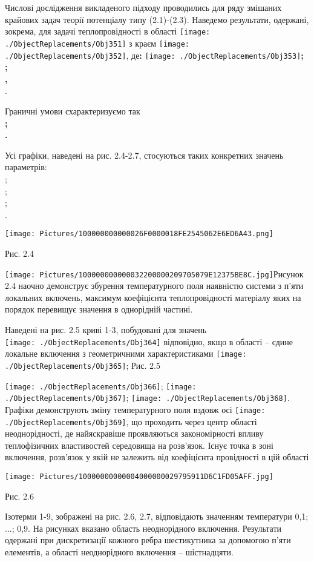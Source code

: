 Числові дослідження викладеного підходу проводились для ряду змішаних
крайових задач теорії потенціалу типу (2.1)-(2.3). Наведемо результати,
одержані, зокрема, для задачі теплопровідності в області
\texttt{[image: ./ObjectReplacements/Obj351]}
з краєм
\texttt{[image: ./ObjectReplacements/Obj352]},
де\textbf{:
}\texttt{[image: ./ObjectReplacements/Obj353]}\textbf{;
}\[\]\textbf{; }\[\]\textbf{, }\[\].

Граничні умови схарактеризуємо так \[\]\textbf{; }\[\]\textbf{. }

Усі графіки, наведені на рис. 2.4-2.7, стосуються таких конкретних
значень параметрів: \[\]; \[\]; \[\]; \[\].

\texttt{[image: Pictures/100000000000026F0000018FE2545062E6ED6A43.png]}

Рис. 2.4

\texttt{[image: Pictures/100000000000032200000209705079E12375BE8C.jpg]}Рисунок
2.4 наочно демонструє збурення температурного поля наявністю системи з
п'яти локальних включень, максимум коефіцієнта теплопровідності
матеріалу яких на порядок перевищує значення в однорідній частині.

Наведені на рис. 2.5 криві 1-3, побудовані для значень
\[\]\texttt{[image: ./ObjectReplacements/Obj364]}
відповідно, якщо в області -- єдине локальне включення з геометричними
характеристиками
\texttt{[image: ./ObjectReplacements/Obj365]};
Рис. 2.5

\texttt{[image: ./ObjectReplacements/Obj366]};
\texttt{[image: ./ObjectReplacements/Obj367]};
\texttt{[image: ./ObjectReplacements/Obj368]}.
Графіки демонструють зміну температурного поля вздовж осі
\texttt{[image: ./ObjectReplacements/Obj369]},
що проходить через центр області неоднорідності, де найяскравіше
проявляються закономірності впливу теплофізичних властивостей середовища
на розв'язок. Існує точка в зоні включення, розв'язок у якій не залежить
від коефіцієнта провідності в цій області

\texttt{[image: Pictures/10000000000004000000029795911D6C1FD05AFF.jpg]}

Рис. 2.6

Ізотерми 1-9, зображені на рис. 2.6, 2.7, відповідають значенням
температури 0,1; ...; 0,9. На рисунках вказано область неоднорідного
включення. Результати одержані при дискретизації кожного ребра
шестикутника за допомогою п'яти елементів, а області неоднорідного
включення -- шістнадцяти.

